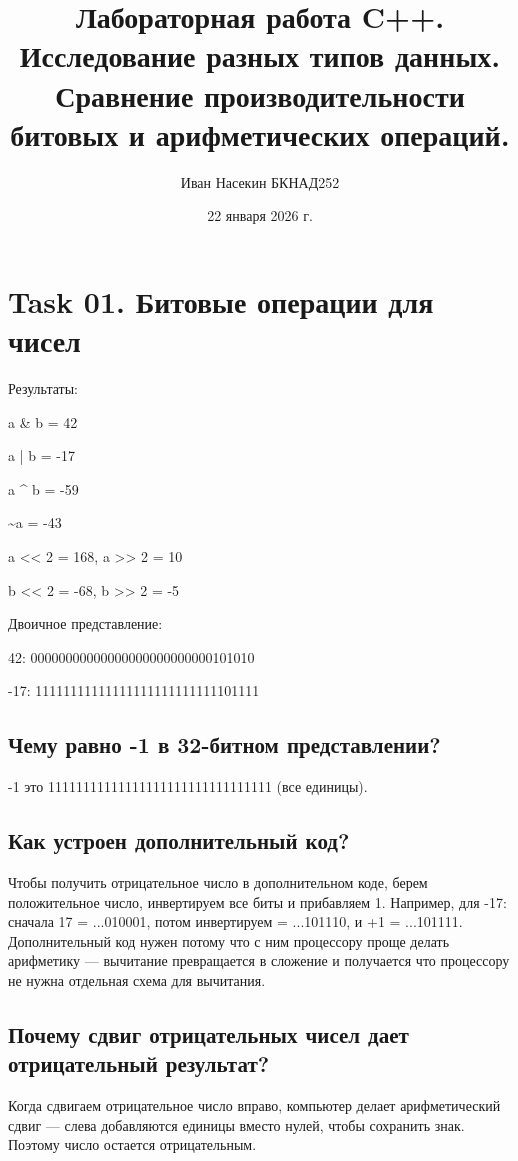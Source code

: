 \documentclass[12pt,a4paper]{article}
\author{Иван Насекин БКНАД252}
\title{Лабораторная работа C++. \\ Исследование разных типов данных. Сравнение производительности битовых и арифметических операций.}
\date{22 января 2026 г.}
\begin{document}
    \maketitle

    \section*{Task 01. Битовые операции для чисел}

    Результаты:

    a \& b = 42

    a | b = -17

    a \^{} b = -59

    \~{}a = -43

    a << 2 = 168, a >> 2 = 10

    b << 2 = -68, b >> 2 = -5

    Двоичное представление:

    42: 00000000000000000000000000101010

    -17: 11111111111111111111111111101111

    \subsection*{Чему равно -1 в 32-битном представлении?}

    -1 это 11111111111111111111111111111111 (все единицы).

    \subsection*{Как устроен дополнительный код?}

    Чтобы получить отрицательное число в дополнительном коде, берем положительное число, инвертируем все биты и прибавляем 1. Например, для -17: сначала 17 = ...010001, потом инвертируем = ...101110, и +1 = ...101111.
    Дополнительный код нужен потому что с ним процессору проще делать арифметику — вычитание превращается в сложение и получается что процессору не нужна отдельная схема для вычитания.

    \subsection*{Почему сдвиг отрицательных чисел дает отрицательный результат?}

    Когда сдвигаем отрицательное число вправо, компьютер делает арифметический сдвиг — слева добавляются единицы вместо нулей, чтобы сохранить знак. Поэтому число остается отрицательным.
\end{document}
